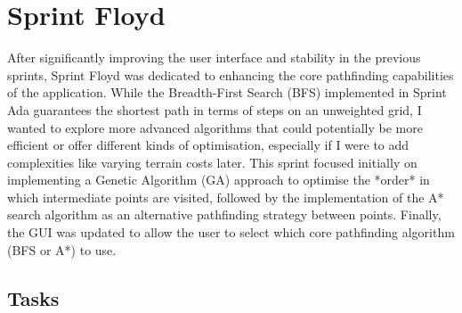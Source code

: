 \newpage


\section{Sprint Floyd}

After significantly improving the user interface and stability in the previous sprints, Sprint Floyd was dedicated to enhancing the core pathfinding capabilities of the application. While the Breadth-First Search (BFS) implemented in Sprint Ada guarantees the shortest path in terms of steps on an unweighted grid, I wanted to explore more advanced algorithms that could potentially be more efficient or offer different kinds of optimisation, especially if I were to add complexities like varying terrain costs later. This sprint focused initially on implementing a Genetic Algorithm (GA) approach to optimise the *order* in which intermediate points are visited, followed by the implementation of the A* search algorithm as an alternative pathfinding strategy between points. Finally, the GUI was updated to allow the user to select which core pathfinding algorithm (BFS or A*) to use.

\subsection{Tasks}

